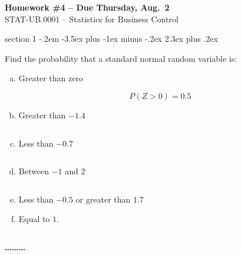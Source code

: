 \documentclass[11pt]{exam}
\makeatletter
\newenvironment{problem}{\@startsection
       {section}
       {1}
       {-.2em}
       {-3.5ex plus -1ex minus -.2ex}
       {2.3ex plus .2ex}
       {\pagebreak[3]%
       \large\bf\noindent{Problem }
       }
       }
       {%
       \begin{center}\large\bf \ldots\ldots\ldots\end{center}}
\makeatother
\begin{document}
\begin{center}
  \large
  \textbf{Homework \#4 -- Due Thursday, Aug.~2} \\
  STAT-UB.0001 -- Statistics for Business Control \\
\end{center}


\thispagestyle{empty}


\begin{problem}{}

Find the probability that a standard normal random variable is:

\begin{enumerate}[(a)]

  \item Greater than zero

\begin{solution}
  \[
    P(Z > 0) = 0.5
  \]
\end{solution}

  \item Greater than $-1.4$

\begin{solution}
  \[
  \]
\end{solution}

  \item Less than $-0.7$

\begin{solution}
  \[
  \]
\end{solution}

  \item Between $-1$ and $2$

\begin{solution}
  \[
  \]
\end{solution}

  \item Less than $-0.5$ or greater than $1.7$
\begin{solution}
\end{solution}

  \item Equal to $1$.

\begin{solution}
  \[
  \]
\end{solution}


\end{enumerate}

\end{problem}
\end{document}
